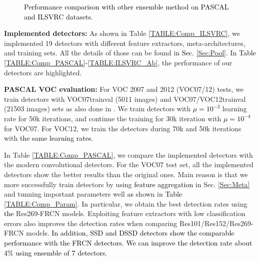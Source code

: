 \documentclass[10pt,twocolumn,letterpaper]{article}
\newcommand{\RV}{\textcolor{black}}
\begin{document}
\begin{figure*}[!tbp]
\begin{center}
\vspace{-10pt}
\end{center}
\vspace{-5pt}
\caption{\RV{Performance comparison with other ensemble method \cite{HuangRSZKFFWSG_Corr16} on PASCAL and ILSVRC datasets.}}
\vspace{-5pt}
\label{fig:Ens_comp}
\end{figure*}

\textbf{Implemented detectors:} 
As shown in Table  \ref{TABLE:Comp_ILSVRC}, we implemented   19 detectors with different feature extractors, meta-architectures, and training sets. All the details of those can be found in \RV{Sec.} \ref{Sec:Pool}.  In  \RV{Table} \ref{TABLE:Comp_PASCAL}-\ref{TABLE:ILSVRC_Ab}, the performance of our detectors are highlighted.



\textbf{PASCAL VOC evaluation:} 
For VOC 2007 and 2012 (VOC07/12) tests, we train detectors with VOC07trainval (5011 images) and VOC07/VOC12trainval (21503 images) sets as also done in \cite{Girshick15_ICCV15, RenHGS15_NIPS15, LiuAESRFB_ECCV16, RedmonDGF_CVPR16}. We train detectors with \RV{$\mu=10^{-3}$} learning rate for 50k iterations, and continue the training for 30k iteration with \RV{$\mu=10^{-4}$} for VOC07. For VOC12, we  train the detectors during 70k and 50k iterations with \RV{the same learning rates}. 

In Table \ref{TABLE:Comp_PASCAL}, we compare the implemented detectors with the modern convolutional detectors. For the VOC07 test set, all the implemented detectors show the better results than the original ones. Main reason is that we more successfully train detectors by using \RV{feature aggregation} in Sec. \ref{Sec:Meta} and tunning important parameters well \RV{as} shown in  \RV{Table} \ref{TABLE:Comp_Param}. In particular, we obtain the best detection rates using \RV{the} Res269-FRCN models. Exploiting feature extractors with low classification errors  also improves the detection rates when comparing Res101/Res152/Res269-FRCN models.  \RV{In addition, SSD and DSSD detectors show the comparable performance with the FRCN detectors.  We can improve the detection rate about 4\% using ensemble of 7 detectors.}
\end{document}

